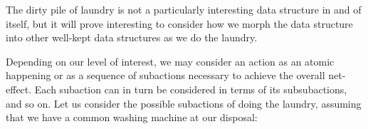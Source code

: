 




The dirty pile of laundry is not a particularly interesting data structure in
and of itself, but it will prove interesting to consider how we morph the data
structure into other well-kept data structures as we do the laundry.

Depending on our level of interest, we may consider an action as an atomic
happening or as a sequence of subactions necessary to achieve the overall
net-effect. Each subaction can in turn be considered in terms of its
subsubactions, and so on. Let us consider the possible subactions of doing the
laundry, assuming that we have a common washing machine at our disposal:

